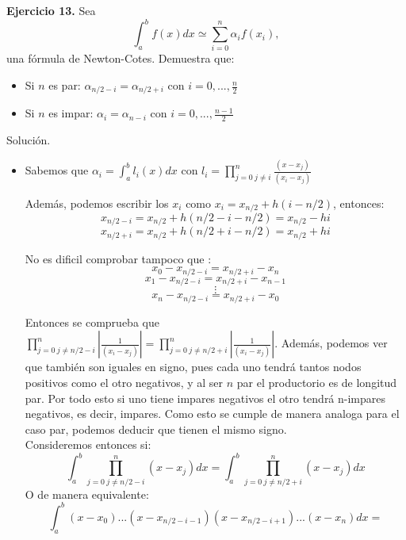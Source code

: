\documentclass[11pt]{article}
\begin{document}
\textbf{Ejercicio 13.} Sea $$ \int_a^b f(x) dx \simeq \sum_{i=0}^n \alpha_i f(x_i),  $$
una fórmula de Newton-Cotes. Demuestra que:

\begin{itemize}
\item Si $n$ es par: $ \alpha_{n/2-i}=\alpha_{n/2+i}$ con $ i = 0,...,\frac{n}{2}$
\item Si $n$ es impar: $ \alpha_{i}=\alpha_{n-i}$ con $ i = 0,...,\frac{n-1}{2}$
\end{itemize}

{Solución.\\}

\begin{itemize}
\item Sabemos que $\alpha_{i}=\int_a^b l_i(x) dx $ con $l_i = \prod_{j = 0  \ j\neq i}^n \frac{(x-x_j)}{(x_i-x_j)}$

Además, podemos escribir los $x_i$ como $x_i= x_{n/2} + h(i-n/2)$, entonces:   $$x_{n/2-i}  = x_{n/2} + h(n/2-i-n/2)   = x_{n/2} - hi $$
$$x_{n/2+i} = x_{n/2} + h(n/2+i-n/2) = x_ {n/2} + hi $$



No es dificil comprobar tampoco que :
$$  x_0 - x_{n/2-i} = x_{n/2+i}-x_n$$
$$ x_1 - x_{n/2-i} = x_{n/2+i}-x_{n-1}$$
$$\vdots$$
$$  x_n - x_{n/2-i} = x_{n/2+i}-x_0$$

Entonces se comprueba que $\prod_{j = 0  \ j\neq n/2-i}^n |\frac{1}{(x_i-x_j)}|=\prod_{j = 0  \ j\neq n/2+i}^n |\frac{1}{(x_i-x_j)}|$. Además, podemos ver que también son iguales en signo, pues cada uno tendrá tantos nodos positivos como el otro negativos, y al ser $n$ par el productorio es de longitud par. Por todo esto si uno tiene impares negativos el otro tendrá  n-impares negativos, es decir, impares. Como esto se cumple de manera analoga para el caso par, podemos deducir que tienen el mismo signo.\\

Consideremos entonces si: $$\int_a^b  \prod_{j = 0  \ j\neq n/2-i}^n (x-x_j)  dx = \int_a^b  \prod_{j = 0  \ j\neq n/2+i}^n (x-x_j)  dx$$
O de manera equivalente:
 \begin{equation}
 \int_a^b (x-x_0)...(x-x_{n/2-i-1}) (x-x_{n/2-i+1}) ... (x-x_n)dx =
 \end{equation}


\end{itemize}
\end{document}
